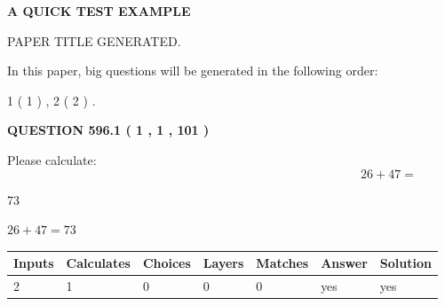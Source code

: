 \documentclass[12pt]{article}
\begin{document}
   
 \vspace{0.2in}
{\LARGE {\textbf{ A QUICK TEST EXAMPLE}}}
   
   
 PAPER TITLE GENERATED.
   
   
   
\vspace{0.2in}
   
In this paper, big questions will be generated in the following order: 
   
   
   1 ( 1 )
 ,
   2 ( 2 )
 .
  
\vspace{0.2in}
  
{\textbf{\Large{QUESTION
596.1 
 ( 1 , 1 , 101 )
}}}
  
  
 
Please calculate:
\begin{equation}
26 +  %
47 = \nonumber
\end{equation}
 
 
 
\noindent{}
 
 

73
 
 
\noindent{}
 
 

 
 
 
\noindent{}
 
 

$ %
26 +  %
47=   %
73$
 
 
\noindent{}
 
 

 
   
   
   
   
\noindent\begin{tabular}{|l|l|l|l|l|l|l|}
 \hline
Inputs & Calculates & Choices & Layers & Matches & Answer & Solution \\ \hline
 2  & 
 1  & 
 0
  & 
 0  & 
 0  & 
  yes & 
  yes 
  \\ \hline
 \end{tabular}
   
   
   
   
\noindent{}
   
\end{document}
